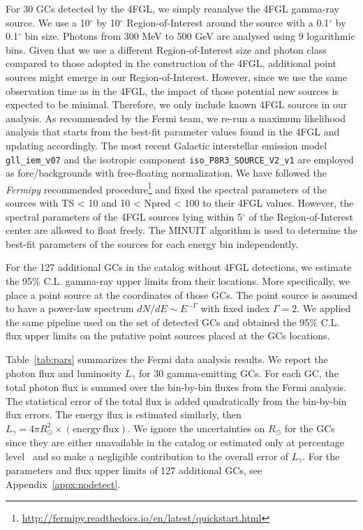 \documentclass[doublespace,nopageskip]{VTthesis} %
\begin{document}
For 30 GCs detected by the 4FGL, we simply reanalyse the 4FGL gamma-ray source. We use a 10$^{\circ}$ by 10$^{\circ}$ Region-of-Interest around the source with a 0.1$^{\circ}$ by 0.1$^{\circ}$ bin size. Photons from 300 MeV to 500 GeV are analysed using 9 logarithmic bins. Given that we use a different Region-of-Interest size and photon class compared to those adopted in the construction of the 4FGL, additional point sources might emerge in our Region-of-Interest. However, since we use the same observation time as in the 4FGL, the impact of those potential new sources is expected to be minimal. Therefore, we only include known 4FGL sources in our analysis. As recommended by the Fermi team, we re-run a maximum likelihood analysis that starts from the best-fit parameter values found in the 4FGL and updating accordingly. The most recent Galactic interstellar emission model \texttt{gll\_iem\_v07} and the isotropic component \texttt{iso\_P8R3\_SOURCE\_V2\_v1} are employed as fore/backgrounds with free-floating normalization. We have followed the \textit{Fermipy} recommended procedure\footnote{\url{http://fermipy.readthedocs.io/en/latest/quickstart.html}} and fixed the spectral parameters of the sources with TS < 10 and 10 < Npred < 100 to their 4FGL values. However, the spectral parameters of the 4FGL sources lying within 5$^{\circ}$ of the Region-of-Interest center are allowed to float freely. The \textsc{MINUIT} algorithm is used to determine the best-fit parameters of the sources for each energy bin independently.

For the 127 additional GCs in the \citet{1996AJ....112.1487H} catalog without 4FGL detections, we estimate the 95\% C.L. gamma-ray upper limits from their locations. More specifically, we place a point source at the coordinates of those GCs. The point source is assumed to have a power-law spectrum $dN/dE\sim E^{-\Gamma}$ with fixed index $\Gamma = 2$. We applied the same pipeline used on the set of detected GCs and obtained the 95\% C.L. flux upper limits on the putative point sources placed at the GCs locations.

Table~\ref{tab:pars} summarizes the Fermi data analysis results. We report the photon flux and luminosity $L_\gamma$ for 30 gamma-emitting GCs. For each GC, the total photon flux is summed over the bin-by-bin fluxes from the Fermi analysis. The statistical error of the total flux is added quadratically from the bin-by-bin flux errors. The energy flux is estimated similarly, then $L_\gamma = 4\pi R_\odot^2 \times (\mathrm{energy\ flux})$. We ignore the uncertainties on $R_\odot$ for the GCs since they are either unavailable in the \citet{1996AJ....112.1487H} catalog or estimated only at percentage level~\citep{2017MNRAS.464.2174B} and so make a negligible contribution to the overall error of $L_\gamma$. For the parameters and flux upper limits of 127 additional GCs, see Appendix~\ref{appx:nodetect}.
\end{document}
